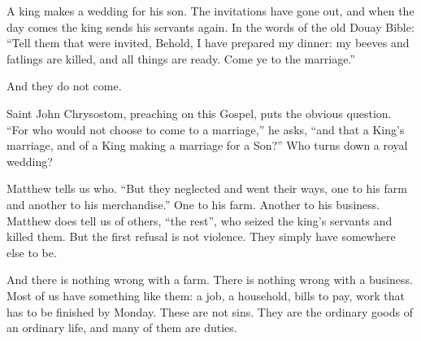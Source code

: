 %

A king makes a wedding for his son. The invitations have gone out, and when
the day comes the king sends his servants again. In the words of the old Douay
Bible: ``Tell them that were invited, Behold, I have prepared my dinner: my
beeves and fatlings are killed, and all things are ready. Come ye to the
marriage.''

And they do not come.

Saint John Chrysostom, preaching on this Gospel, puts the obvious question.
``For who would not choose to come to a marriage,'' he asks, ``and that a
King's marriage, and of a King making a marriage for a Son?'' Who turns down a
royal wedding?

Matthew tells us who. ``But they neglected and went their ways, one to his
farm and another to his merchandise.'' One to his farm. Another to his
business. Matthew does tell us of others, ``the rest'', who seized the king's
servants and killed them. But the first refusal is not violence. They simply
have somewhere else to be.

And there is nothing wrong with a farm. There is nothing wrong with a
business. Most of us have something like them: a job, a household, bills to
pay, work that has to be finished by Monday. These are not sins. They are the
ordinary goods of an ordinary life, and many of them are duties.

